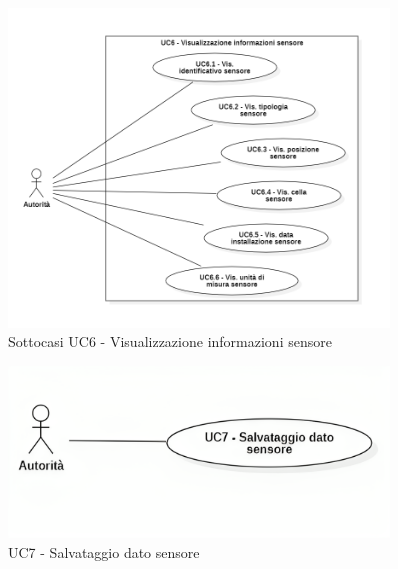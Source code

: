 \begin{figure}[H]
    \centering
    \includegraphics[width=0.9\textwidth]{../Images/uc6_Subcase.PNG}
    \caption{Sottocasi UC6 - Visualizzazione informazioni sensore}
    \label{fig:UC6_sub}
\end{figure}













\begin{figure}[H]
    \centering
    \includegraphics[width=0.9\textwidth]{../Images/uc7.png}
    \caption{UC7 - Salvataggio dato sensore}
    \label{fig:UC7}
\end{figure}


